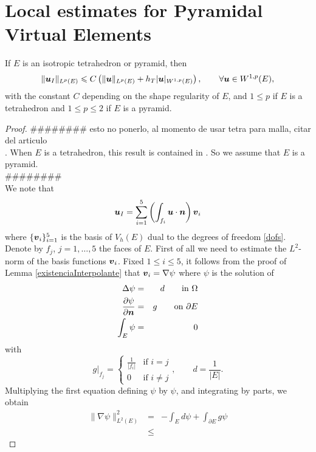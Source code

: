\section{Local estimates for Pyramidal Virtual Elements}

\begin{theorem}
If $E$ is an isotropic tetrahedron or pyramid, then  
\begin{equation}\label{estab2}
\|\boldsymbol{u}_I\|_{L^p(E)}\leqslant C\left(\|\boldsymbol{u}\|_{L^p(E)}+ h_T|\boldsymbol{u}|_{W^{1,p}(E)}\right), \qquad \forall \boldsymbol{u}\in W^{1,p}(E),
\end{equation}
with the constant $C$ depending on the shape regularity of $E$, and $1\leqslant p$ if $E$ is a tetrahedron and $1\leqslant p\leqslant 2$ if $E$ is a pyramid.
\end{theorem}
\begin{proof}
{\color{blue}\#\#\#\#\#\#\#\# esto no ponerlo, al momento de usar tetra para
malla, citar del articulo\\.}
When $E$ is a tetrahedron, this result is contained in \cite{aadl}. So we assume that $E$ is a pyramid.\\ 
{\color{blue}\#\#\#\#\#\#\#\#\\}
We note that 
\begin{equation}\label{estab2:eq1}
\boldsymbol{u}_I=\sum_{i=1}^5 \left(\int_{f_i}\boldsymbol{u}\cdot \boldsymbol{n}\right)\boldsymbol{v}_i
\end{equation}
where $\{\boldsymbol{v}_i\}_{i=1}^5$ is the basis of $V_h(E)$ dual to the degrees of freedom
\ref{dofs}. Denote by $f_j$, $j=1,\ldots,5$ the faces of $E$. First of all we need to estimate the $L^2$-norm of the basis functions $\boldsymbol{v}_i$. Fixed $1\leqslant i\leqslant 5$, it follows from the proof of Lemma \ref{existenciaInterpolante} that $\boldsymbol{v}_i=\nabla \psi$ where $\psi$ is the solution of
\begin{eqnarray*}
\Delta\psi&=&d\qquad\mbox{in }\Omega\\ \frac{\partial\psi}{\partial\boldsymbol{n}}&=&g\qquad\mbox{on }\partial E\\ \int_E\psi&=&0
\end{eqnarray*}
with
\[
g|_{f_j}=\left\{\begin{array}{cl}\frac1{|f_i|}&\mbox{if }i=j\\0&\mbox{if }i\ne j\end{array}\right., \qquad d=\frac1{|E|}.
\]
Multiplying the first equation defining $\psi$ by $\psi$, and integrating by parts, we obtain
\begin{eqnarray*}
\|\nabla\psi\|_{L^2(E)}^2 &=& -\int_Ed\psi + \int_{\partial E}g\psi\\ &\leqslant & 

\end{eqnarray*}
\end{proof}
